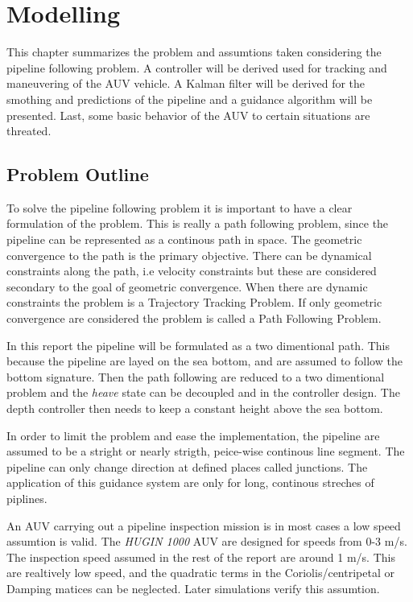 \chapter{Modelling}
	This chapter summarizes the problem and assumtions taken considering the pipeline following problem.
	A controller will be derived used for tracking and maneuvering of the AUV vehicle. A Kalman filter
	will be derived for the smothing and predictions of the pipeline and a guidance algorithm will be
	presented. Last, some basic behavior of the AUV to certain situations are threated. 


\section{Problem Outline}
\label{chap2:problem}
	To solve the pipeline following problem it is important to have a clear formulation of the problem.
	This is really a path following problem, since the pipeline can be represented as a continous path in
	space. The geometric convergence to the path is the primary objective. There can be dynamical
	constraints along the path, i.e velocity constraints but these are considered secondary to the goal of
	geometric convergence. When there are dynamic constraints the problem is a Trajectory Tracking
	Problem. If only geometric convergence are considered the problem is called a Path Following Problem.
	\cite{guidance-path-2d-3d}

	In this report the pipeline will be formulated as a two dimentional path. This because the pipeline
	are layed on the sea bottom, and are assumed to follow the bottom signature. Then the path following
	are reduced to a two dimentional problem and the \textit{heave} state can be decoupled and in the
	controller design. The depth controller then needs to keep a constant height above the sea bottom.

	In order to limit the problem and ease the implementation, the pipeline are assumed to be a stright or
	nearly strigth, peice-wise continous line segment. The pipeline can only change direction at defined
	places called junctions. The application of this guidance system are only for long, continous streches of
	piplines. 

	An AUV carrying out a pipeline inspection mission is in most cases a low speed assumtion is valid. The
	\textit{HUGIN 1000} AUV are designed for speeds from 0-3 m/s. The inspection speed assumed in the
	rest of the report are around 1 m/s. This are realtively low speed, and the quadratic terms in the
	Coriolis/centripetal or Damping matices can be neglected. Later simulations verify this assumtion.

